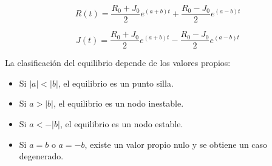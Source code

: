 \documentclass[10pt]{article}
\numberwithin{equation}{section}
\begin{document}
\[
\boxed{
R(t)=
\frac{R_0+J_0}{2}e^{(a+b)t}
+
\frac{R_0-J_0}{2}e^{(a-b)t}
}
\]

\[
\boxed{
J(t)=
\frac{R_0+J_0}{2}e^{(a+b)t}
-
\frac{R_0-J_0}{2}e^{(a-b)t}
}
\]

La clasificación del equilibrio depende de los valores propios:

\begin{itemize}
    \item Si $|a|<|b|$, el equilibrio es un punto silla.
    \item Si $a>|b|$, el equilibrio es un nodo inestable.
    \item Si $a<-|b|$, el equilibrio es un nodo estable.
    \item Si $a=b$ o $a=-b$, existe un valor propio nulo y se obtiene un caso degenerado.
\end{itemize}

\end{document}
